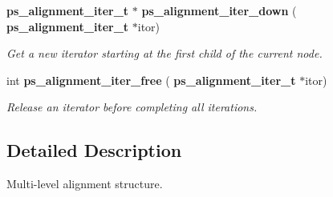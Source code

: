 \begin{DoxyCompactItemize}
\mbox{\label{ps__alignment_8h_a6356f643a01e2071c6f00f8a5d56565a}} 
\textbf{ ps\+\_\+alignment\+\_\+iter\+\_\+t} $\ast$ \textbf{ ps\+\_\+alignment\+\_\+iter\+\_\+down} (\textbf{ ps\+\_\+alignment\+\_\+iter\+\_\+t} $\ast$itor)
\begin{DoxyCompactList}\small\item\em Get a new iterator starting at the first child of the current node. \end{DoxyCompactList}\item 
\mbox{\label{ps__alignment_8h_a80e0020539ea622706bf63883e24d301}} 
int \textbf{ ps\+\_\+alignment\+\_\+iter\+\_\+free} (\textbf{ ps\+\_\+alignment\+\_\+iter\+\_\+t} $\ast$itor)
\begin{DoxyCompactList}\small\item\em Release an iterator before completing all iterations. \end{DoxyCompactList}\end{DoxyCompactItemize}


\subsection{Detailed Description}
Multi-\/level alignment structure. 

